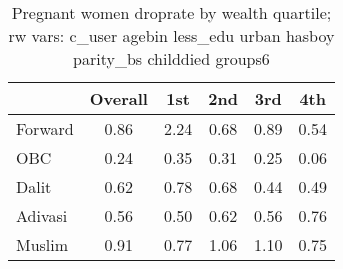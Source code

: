 \begin{table}[htbp]\centering
\caption{Pregnant women droprate by wealth quartile; rw vars: c\_user agebin less\_edu urban hasboy parity\_bs childdied groups6}
\begin{tabular}{l*{5}{c}}
\toprule
            &\multicolumn{1}{c}{Overall}&\multicolumn{1}{c}{1st}&\multicolumn{1}{c}{2nd}&\multicolumn{1}{c}{3rd}&\multicolumn{1}{c}{4th}\\
\midrule
\midrule
Forward     &        0.86&        2.24&        0.68&        0.89&        0.54\\
OBC         &        0.24&        0.35&        0.31&        0.25&        0.06\\
Dalit       &        0.62&        0.78&        0.68&        0.44&        0.49\\
Adivasi     &        0.56&        0.50&        0.62&        0.56&        0.76\\
Muslim      &        0.91&        0.77&        1.06&        1.10&        0.75\\
\bottomrule
\end{tabular}
\end{table}
